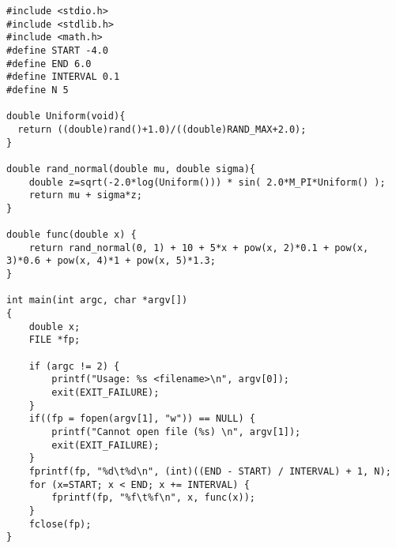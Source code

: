 \begin{lstlisting}[caption=generate\_data.c,label=gd]
#include <stdio.h>
#include <stdlib.h>
#include <math.h>
#define START -4.0
#define END 6.0
#define INTERVAL 0.1
#define N 5

double Uniform(void){
  return ((double)rand()+1.0)/((double)RAND_MAX+2.0);
}

double rand_normal(double mu, double sigma){
    double z=sqrt(-2.0*log(Uniform())) * sin( 2.0*M_PI*Uniform() );
    return mu + sigma*z;
}

double func(double x) {
    return rand_normal(0, 1) + 10 + 5*x + pow(x, 2)*0.1 + pow(x, 3)*0.6 + pow(x, 4)*1 + pow(x, 5)*1.3;
}

int main(int argc, char *argv[])
{
    double x;
    FILE *fp;

    if (argc != 2) {
        printf("Usage: %s <filename>\n", argv[0]);
        exit(EXIT_FAILURE);
    }
    if((fp = fopen(argv[1], "w")) == NULL) {
        printf("Cannot open file (%s) \n", argv[1]);
        exit(EXIT_FAILURE);
    }
    fprintf(fp, "%d\t%d\n", (int)((END - START) / INTERVAL) + 1, N);
    for (x=START; x < END; x += INTERVAL) {
        fprintf(fp, "%f\t%f\n", x, func(x));
    }
    fclose(fp);
}  
\end{lstlisting}